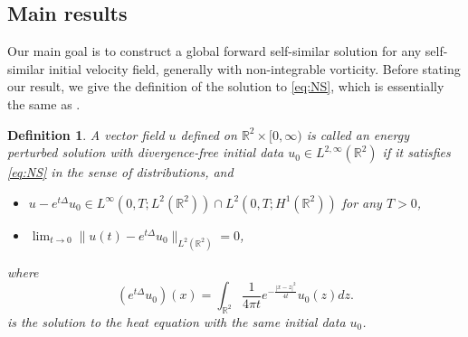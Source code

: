 \documentclass[12pt]{amsart}
\numberwithin{equation}{section}              %
\newtheorem{definition}{Definition}[section]
\theoremstyle{remark}
\begin{document}
    \subsection{Main results}
	Our main goal is to construct a global forward self-similar solution for any self-similar initial velocity field, generally with non-integrable vorticity. Before stating our result, we give the definition of the solution to \eqref{eq:NS}, which is essentially the same as \cite[Definition 8.18]{Tsai18}. 
	\begin{definition}\label{def:energy persol}
		A vector field $u$ defined on $\mathbb{R}^2\times[0,\infty)$ is called an energy perturbed solution with divergence-free initial data $u_0\in L^{2,\infty}(\mathbb{R}^2) $ 
		if it satisfies  \eqref{eq:NS} in the sense of distributions, and \begin{itemize}
			\item[(i)]  $u- e^{t\Delta}u_0 \in L^{\infty}(0,T;L^2(\mathbb{R}^2))\cap L^{2}(0,T;H^1(\mathbb{R}^2))$ for any $T>0$,
			\item[(ii)] $\lim_{t\to 0} \|u(t)- e^{t\Delta}u_0 \|_{L^2(\mathbb{R}^2)} = 0$,
		\end{itemize}
		where \begin{equation*}
			(e^{t\Delta}u_0) (x) = \int_{\mathbb{R}^2} \frac{1}{4\pi t}e^{-\frac{|x-z|^2}{4 t}}u_0(z)dz.
		\end{equation*}
		is the solution to the heat equation with the same initial data $u_0$.
	\end{definition}
	
\end{document}
